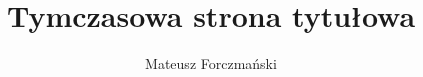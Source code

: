 \documentclass[a4paper]{book}
\title{Tymczasowa strona tytułowa}
\author{Mateusz Forczmański}
\begin{document}


\mainmatter









\nocite{*}
\printbibliography


\listoffigures
\listoftables
\listofalgorithms
\end{document}
